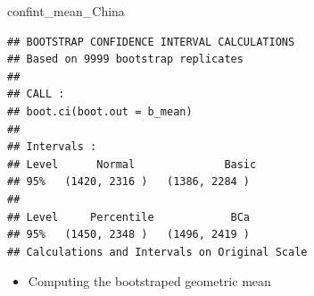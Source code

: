 \documentclass[
]{book}
\newenvironment{Shaded}{\begin{snugshade}}{\end{snugshade}}
\newcommand{\NormalTok}[1]{#1}
\providecommand{\tightlist}{%
  \setlength{\itemsep}{0pt}\setlength{\parskip}{0pt}}
\begin{document}
\begin{Shaded}
\begin{Highlighting}[]
\NormalTok{confint\_mean\_China}
\end{Highlighting}
\end{Shaded}

\begin{verbatim}
## BOOTSTRAP CONFIDENCE INTERVAL CALCULATIONS
## Based on 9999 bootstrap replicates
## 
## CALL : 
## boot.ci(boot.out = b_mean)
## 
## Intervals : 
## Level      Normal              Basic         
## 95%   (1420, 2316 )   (1386, 2284 )  
## 
## Level     Percentile            BCa          
## 95%   (1450, 2348 )   (1496, 2419 )  
## Calculations and Intervals on Original Scale
\end{verbatim}

\begin{itemize}
\tightlist
\item
  Computing the bootstraped geometric mean
\end{itemize}
\end{document}
